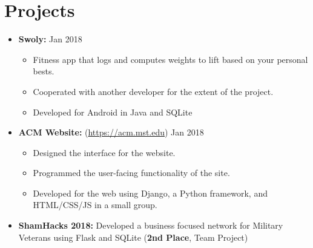 \documentclass[10pt,oneside]{article}
\begin{document}
\section*{Projects}
\vspace*{-4pt}
\begin{itemize}
	\item[] \textbf{Swoly:}
		\hfill
		Jan 2018
			\begin{itemize}
				\item[\textbullet] Fitness app that logs and computes weights to lift based on your personal bests.
				\item[\textbullet] Cooperated with another developer for the extent of the project.
				\item[\textbullet] Developed for Android in Java and SQLite
			\end{itemize}
	\item[] \textbf{ACM Website:} (\url{https://acm.mst.edu})
		\hfill
		Jan 2018
			\begin{itemize}
				\item[\textbullet] Designed the interface for the website.
				\item[\textbullet] Programmed the user-facing functionality of the site.
				\item[\textbullet] Developed for the web using Django, a Python framework, and HTML/CSS/JS in a small group.
			\end{itemize}
	\item[] \textbf{ShamHacks 2018:} Developed a business focused network for Military Veterans using Flask and SQLite (\textbf{2nd Place}, Team Project)
\end{itemize}

\vspace*{-16pt}
\end{document}
